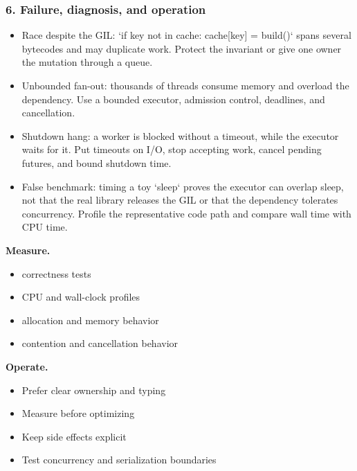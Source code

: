 \subsubsection*{6. Failure, diagnosis, and operation}
\begin{itemize}
\item Race despite the GIL: `if key not in cache: cache[key] = build()` spans several bytecodes and may duplicate work. Protect the invariant or give one owner the mutation through a queue.
\item Unbounded fan-out: thousands of threads consume memory and overload the dependency. Use a bounded executor, admission control, deadlines, and cancellation.
\item Shutdown hang: a worker is blocked without a timeout, while the executor waits for it. Put timeouts on I/O, stop accepting work, cancel pending futures, and bound shutdown time.
\item False benchmark: timing a toy `sleep` proves the executor can overlap sleep, not that the real library releases the GIL or that the dependency tolerates concurrency. Profile the representative code path and compare wall time with CPU time.
\end{itemize}
\textbf{Measure.}\begin{itemize}
\item correctness tests
\item CPU and wall-clock profiles
\item allocation and memory behavior
\item contention and cancellation behavior
\end{itemize}
\textbf{Operate.}\begin{itemize}
\item Prefer clear ownership and typing
\item Measure before optimizing
\item Keep side effects explicit
\item Test concurrency and serialization boundaries
\end{itemize}
